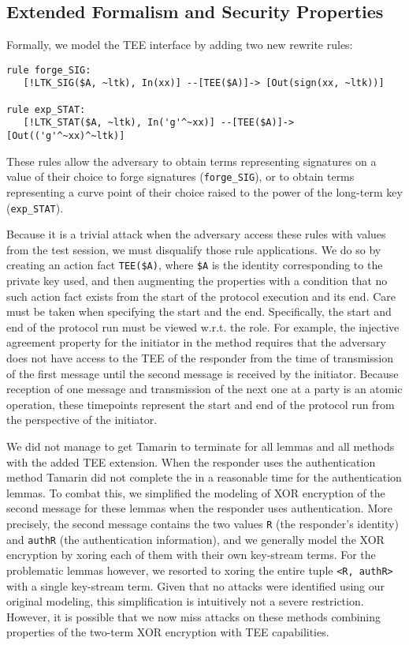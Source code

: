 \documentclass[runningheads]{llncs}
\begin{document}
\subsection{Extended Formalism and Security Properties}
\label{sec:TEE:fmAndProps}
Formally, we model the TEE interface by adding two new rewrite rules:
%
\begin{small}
\begin{verbatim}
rule forge_SIG:
   [!LTK_SIG($A, ~ltk), In(xx)] --[TEE($A)]-> [Out(sign(xx, ~ltk))]

rule exp_STAT:
   [!LTK_STAT($A, ~ltk), In('g'^~xx)] --[TEE($A)]-> [Out(('g'^~xx)^~ltk)]
\end{verbatim}
\end{small}
%
These rules allow the adversary to obtain terms representing signatures on a
value of their choice to forge signatures (\verb|forge_SIG|), or to obtain terms
representing a curve point of their choice raised to the power of the
long-term key (\verb|exp_STAT|).
%

Because it is a trivial attack when the adversary access these rules with values
from the test session, we must disqualify those rule applications.
%
We do so by creating an action fact \verb|TEE($A)|, where \verb|$A| is the
identity corresponding to the private key used, and then augmenting the
properties with a condition that no such action fact exists from the start of
the protocol execution and its end.
%
Care must be taken when specifying the start and the end.
%
Specifically, the start and end of the protocol run must be viewed w.r.t. the
role.
%
For example, the injective agreement property for the initiator in
the \mSigSig{} method requires that the adversary does not have access to the
TEE of the
responder from the time of transmission of the first message until the second
message is received by the initiator.
%
Because reception of one message and transmission of the next one at a party
is an atomic operation, these timepoints represent the start and end of the
protocol run from the perspective of the initiator.
%

We did not manage to get Tamarin to terminate for all lemmas and all methods
with the added TEE extension.
%
When the responder uses the \mStat{} authentication method Tamarin did not
complete the in a reasonable time for the authentication lemmas.
%
To combat this, we simplified the modeling of XOR encryption of the second
message for these lemmas when the responder uses \mStat{} authentication.
%
More precisely, the second message contains the two values \verb|R| (the
responder's identity) and
\verb|authR| (the authentication information), and we generally model the
XOR encryption by xoring each of them with their own key-stream terms.
%
For the problematic lemmas however, we resorted to xoring the entire tuple
\verb|<R, authR>| with a single key-stream term.
%
Given that no attacks were identified using our original modeling, this
simplification is intuitively not a severe restriction.
%
However, it is possible that we now miss attacks on these methods
combining properties of the two-term XOR encryption with TEE capabilities.
%
\end{document}
